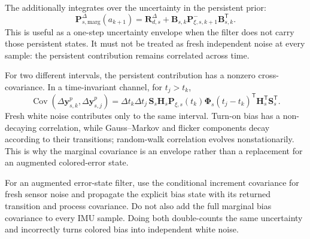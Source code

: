 \documentclass[11pt,oneside,headings=big]{scrreprt}
\newcommand{\Cov}{\operatorname{Cov}}
\newcommand{\transpose}{\mathsf{T}}
\newcommand{\vect}[1]{\bm{#1}}
\newcommand{\mat}[1]{\bm{#1}}
\begin{document}
    The  additionally integrates over
    the uncertainty in the persistent prior:
    \begin{equation}
        \mat P^\Delta_{s,\mathrm{marg}}(a_{k+1})
        =\mat R^\Delta_{d,s}
        +\mat B_{s,k}\mat P_{\xi,s,k+1}^{-}\mat B_{s,k}^{\mathsf T}.
        \label{eq:characterization-marginal}
    \end{equation}
    This is useful as a one-step uncertainty envelope when the filter does not
    carry those persistent states. It must not be treated as fresh independent
    noise at every sample: the persistent contribution remains correlated across
    time.

    For two different intervals, the persistent contribution has a nonzero
    cross-covariance. In a time-invariant channel, for $t_j>t_k$,
    \begin{equation}
        \Cov(\Delta\vect y^p_{s,k},\Delta\vect y^p_{s,j})
        =\Delta t_k\Delta t_j\,
        \mat S_s\mat H_s\mat P_{\xi,s}(t_k)
        \mat\Phi_s(t_j-t_k)^\transpose
        \mat H_s^\transpose\mat S_s^\transpose.
        \label{eq:characterization-cross-covariance}
    \end{equation}
    Fresh white noise contributes only to the same interval. Turn-on bias has a
    non-decaying correlation, while Gauss--Markov and flicker components decay
    according to their transitions; random-walk correlation evolves
    nonstationarily. This is why the marginal covariance is an envelope rather
    than a replacement for an augmented colored-error state.

    \begin{tcolorbox}[
        enhanced,breakable,colback=ImuPaleGold,colframe=ImuGold,
        title={Kalman-filter rule},fonttitle=\bfseries]
        For an augmented error-state filter, use the conditional increment covariance
        for fresh sensor noise and propagate the explicit bias state with its returned
        transition and process covariance. Do not also add the full marginal bias
        covariance to every IMU sample. Doing both double-counts the same uncertainty
        and incorrectly turns colored bias into independent white noise.
    \end{tcolorbox}
\end{document}
